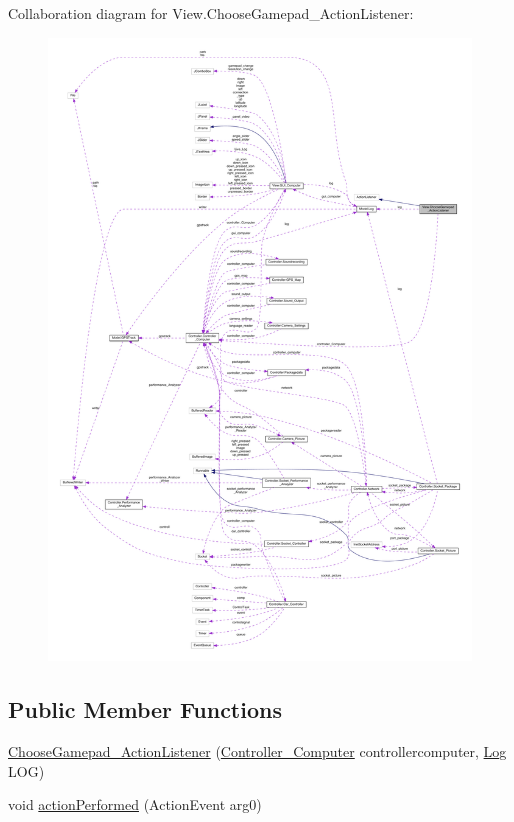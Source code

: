 Collaboration diagram for View.\+Choose\+Gamepad\+\_\+\+Action\+Listener\+:
\nopagebreak
\begin{figure}[H]
\begin{center}
\leavevmode
\includegraphics[width=350pt]{class_view_1_1_choose_gamepad___action_listener__coll__graph}
\end{center}
\end{figure}
\subsection*{Public Member Functions}
\begin{DoxyCompactItemize}
\item 
\hyperlink{class_view_1_1_choose_gamepad___action_listener_a8161f9097a1128b74a747feedfc34c70}{Choose\+Gamepad\+\_\+\+Action\+Listener} (\hyperlink{class_controller_1_1_controller___computer}{Controller\+\_\+\+Computer} controllercomputer, \hyperlink{class_model_1_1_log}{Log} L\+O\+G)
\item 
void \hyperlink{class_view_1_1_choose_gamepad___action_listener_a53f1f1982ba0159f6e25ad09cb5d0378}{action\+Performed} (Action\+Event arg0)
\end{DoxyCompactItemize}


